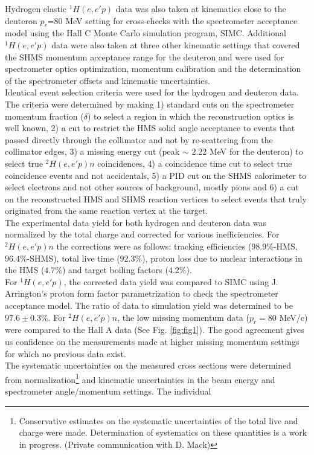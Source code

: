 \indent Hydrogen elastic $^{1}H(e,e'p)$ data was also taken at kinematics close to the deuteron $p_{r}$=80 MeV setting for cross-checks with the spectrometer acceptance model using the  Hall C Monte Carlo
simulation program, SIMC. Additional $^{1}H(e,e'p)$ data were also taken at three other kinematic settings that covered the SHMS momentum acceptance range for the deuteron and were used for spectrometer optics optimization, 
momentum calibration and the determination of the spectrometer offsets and kinematic uncertainties\cite{cyero_specKinUnc,cyero_SHMSOptics}. \\
\indent Identical event selection criteria were used for the hydrogen and deuteron data. The criteria were determined by making 1) standard cuts on the spectrometer momentum fraction ($\delta$) to select a region in which the reconstruction optics
is well known, 2) a cut to restrict the HMS solid angle acceptance to events that passed directly through the collimator and not by re-scattering from the collimator edges, 3) a missing
energy cut (peak $\sim$ 2.22 MeV for the deuteron) to select true $^{2}H(e,e'p)n$ coincidences, 4) a coincidence time cut to select true coincidence events and not accidentals,  5) a PID cut on the
SHMS calorimeter to select electrons and not other sources of background, mostly pions and 6) a cut on the reconstructed HMS and SHMS reaction vertices to select events that truly
originated from the same reaction vertex at the target. \\
\indent The experimental data yield for both hydrogen and deuteron data was normalized by the total charge and corrected for various inefficiencies. For $^{2}H(e,e'p)n$ the corrections were as follows: tracking efficiencies ($98.9 \%$-HMS, $96.4 \%$-SHMS),
total live time ($92.3 \%$), proton loss due to nuclear interactions in the HMS ($4.7 \%$)\cite{cyero_pAbs} and target boiling factors ($4.2 \%$)\cite{cyero_tgtBoil}. \\
\indent For $^{1}H(e,e'p)$, the corrected data yield was compared to SIMC using J. Arrington's proton form factor parametrization\cite{PhysRevC.69.022201} to check the spectrometer acceptance
model. The ratio of data to simulation yield was determined to be $97.6\pm0.3 \%$. For $^{2}H(e,e'p)n$, the low missing momentum data ($p_{r}=80$ MeV/c) were compared to the Hall A data (See Fig. \ref{fig:fig1}).
The good agreement gives us confidence on the measurements made at higher missing momentum settings for which no previous data exist. \\
\indent The systematic uncertainties on the measured cross sections were determined from normalization\footnote{Conservative estimates on the systematic uncertainties of the total live and charge were made.
Determination of systematics on these quantities is a work in progress. (Private communication with D. Mack)} and kinematic uncertainties in the beam energy and spectrometer angle/momentum settings. The individual
